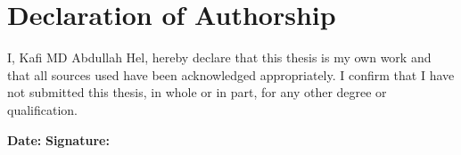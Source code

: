 \chapter*{Declaration of Authorship}

I, Kafi MD Abdullah Hel, hereby declare that this thesis is my own work and that all sources used have been acknowledged appropriately. I confirm that I have not submitted this thesis, in whole or in part, for any other degree or qualification.

\vspace{2cm}

\noindent\textbf{Date:} \hfill \textbf{Signature:}\hspace{5cm}
